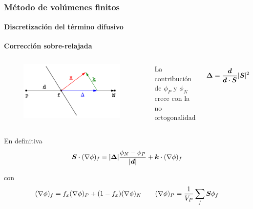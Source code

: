 \begin{frame}
    \frametitle{M\'etodo de vol\'umenes finitos}
    \framesubtitle{Discretizaci\'on del t\'ermino difusivo}

    
    \textbf{Correcci\'on sobre-relajada}
    
    \begin{columns}

    \begin{figure}[h]
      \begin{center}
        \includegraphics[width=0.95\textwidth]{Imagenes/CorreccionSobreRelajada}
      \end{center}
    \end{figure}


    \begin{center}
      La contribuci\'on de $\phi_P$ y $\phi_N$ crece con la no ortogonalidad
    \end{center}

    $$ \boldsymbol{\Delta} = \dfrac{ \boldsymbol{d} }{\boldsymbol{d} \cdot \boldsymbol{S}} |\boldsymbol{S}|^2 $$

    \end{columns}
    

    En definitiva
    $$ \boldsymbol{S} \cdot (\nabla \phi)_f = |\boldsymbol{\Delta}| \dfrac{ \phi_N - \phi_P }{ |\boldsymbol{d}| }  +  \boldsymbol{k} \cdot (\nabla \phi)_f$$

    con
    $$  (\nabla \phi)_f = f_x (\nabla \phi)_P + (1-f_x)(\nabla \phi)_N  \qquad   (\nabla \phi)_P = \frac{1}{V_P} \sum_f \boldsymbol{S} \phi_f  $$    


    
\end{frame}











